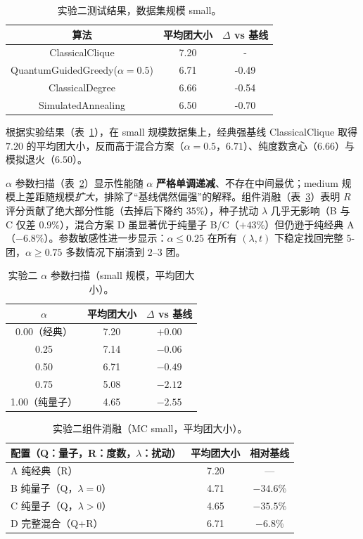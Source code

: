 \documentclass[pre,twocolumn]{revtex4-2}
\begin{document}
\begin{table}[H]
\caption{实验二测试结果，数据集规模 small。}
\label{tbl:exp2}
\centering
\begin{tabular}{ccc}
\hline\hline
算法 & 平均团大小 & $\Delta$ vs 基线 \\
\hline
ClassicalClique & 7.20 & - \\
QuantumGuidedGreedy($\alpha=0.5$) & 6.71 & -0.49 \\
ClassicalDegree & 6.66 & -0.54 \\
SimulatedAnnealing & 6.50 & -0.70 \\
\hline\hline
\end{tabular}
\end{table}

根据实验结果（表~\ref{tbl:exp2}），在 small 规模数据集上，经典强基线 ClassicalClique 取得 $7.20$ 的平均团大小，反而高于混合方案（$\alpha{=}0.5$，$6.71$）、纯度数贪心（$6.66$）与模拟退火（$6.50$）。

$\alpha$ 参数扫描（表~\ref{tbl:alpha}）显示性能随 $\alpha$ \textbf{严格单调递减}、不存在中间最优；medium 规模上差距随规模\emph{扩大}，排除了“基线偶然偏强”的解释。组件消融（表~\ref{tbl:ablation}）表明 $R$ 评分贡献了绝大部分性能（去掉后下降约 $35\%$），种子扰动 $\lambda$ 几乎无影响（B 与 C 仅差 $0.9\%$），混合方案 D 虽显著优于纯量子 B/C（$+43\%$）但仍逊于纯经典 A（$-6.8\%$）。参数敏感性进一步显示：$\alpha\le0.25$ 在所有 $(\lambda,t)$ 下稳定找回完整 5-团，$\alpha\ge0.75$ 多数情况下崩溃到 $2$--$3$ 团。

\begin{table}[H]
\caption{实验二 $\alpha$ 参数扫描（small 规模，平均团大小）。}
\label{tbl:alpha}
\centering
\begin{tabular}{ccc}
\hline\hline
$\alpha$ & 平均团大小 & $\Delta$ vs 基线 \\
\hline
0.00（经典） & 7.20 & $+0.00$ \\
0.25 & 7.14 & $-0.06$ \\
0.50 & 6.71 & $-0.49$ \\
0.75 & 5.08 & $-2.12$ \\
1.00（纯量子） & 4.65 & $-2.55$ \\
\hline\hline
\end{tabular}
\end{table}

\begin{table}[H]
\caption{实验二组件消融（MC small，平均团大小）。}
\label{tbl:ablation}
\centering
\begin{tabular}{lcc}
\hline\hline
配置（Q：量子，R：度数，$\lambda$：扰动） & 平均团大小 & 相对基线 \\
\hline
A 纯经典（R） & 7.20 & --- \\
B 纯量子（Q，$\lambda{=}0$） & 4.71 & $-34.6\%$ \\
C 纯量子（Q，$\lambda{>}0$） & 4.65 & $-35.5\%$ \\
D 完整混合（Q+R） & 6.71 & $-6.8\%$ \\
\hline\hline
\end{tabular}
\end{table}
\end{document}
